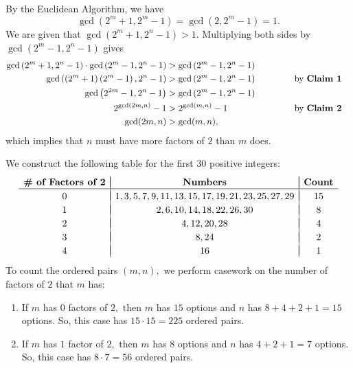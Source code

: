 \begin{enumerate}
 By the Euclidean Algorithm, we have 
 \[\gcd\left(2^m+1,2^m-1\right)=\gcd\left(2,2^m-1\right)=1.\]We are given that $\gcd\left(2^m+1,2^n-1\right)>1.$ Multiplying both sides by $\gcd\left(2^m-1,2^n-1\right)$ gives
 \begin{align*} \gcd\left(2^m+1,2^n-1\right)\cdot\gcd\left(2^m-1,2^n-1\right)&>\gcd\left(2^m-1,2^n-1\right) \\ \gcd\left(\left(2^m+1\right)\left(2^m-1\right),2^n-1\right)&>\gcd\left(2^m-1,2^n-1\right) \hspace{12mm} &&\text{by }\textbf{Claim 1} \\ \gcd\left(2^{2m}-1,2^n-1\right)&>\gcd\left(2^m-1,2^n-1\right) \\ 2^{\gcd(2m,n)}-1&>2^{\gcd(m,n)}-1 &&\text{by }\textbf{Claim 2} \\ \gcd(2m,n)&>\gcd(m,n), \end{align*}
which implies that $n$ must have more factors of $2$ than $m$ does.

 We construct the following table for the first $30$ positive integers:
 \[\begin{array}{c|c|c} && \\ [-2.5ex] \boldsymbol{\#}\textbf{ of Factors of }\boldsymbol{2} & \textbf{Numbers} & \textbf{Count} \\ \hline && \\ [-2.25ex]  0 & 1,3,5,7,9,11,13,15,17,19,21,23,25,27,29 & 15 \\  && \\ [-2.25ex]  1 & 2,6,10,14,18,22,26,30 & 8 \\ && \\ [-2.25ex]  2 & 4,12,20,28 & 4 \\    && \\ [-2.25ex]  3 & 8,24 & 2 \\  && \\ [-2.25ex]  4 & 16 & 1 \\ \end{array}\]To count the ordered pairs $(m,n),$ we perform casework on the number of factors of $2$ that $m$ has:

 
            \begin{enumerate} 
        \item If $m$ has $0$ factors of $2,$ then $m$ has $15$ options and $n$ has $8+4+2+1=15$ options. So, this case has $15\cdot15=225$ ordered pairs.

        \item If $m$ has $1$ factor of $2,$ then $m$ has $8$ options and $n$ has $4+2+1=7$ options. So, this case has $8\cdot7=56$ ordered pairs.


\end{enumerate}
\end{enumerate}
